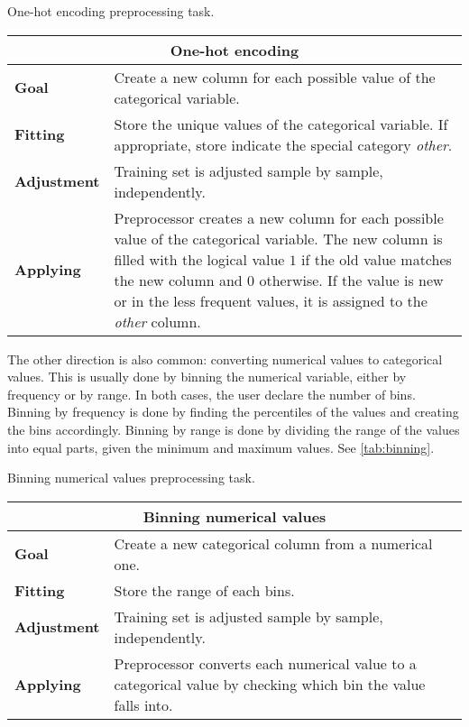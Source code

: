 \begin{tablebox}[label=tab:one-hot]{One-hot encoding preprocessing task.}
  \centering
  \begin{tabular}{lp{6cm}}
    \toprule
    \multicolumn{2}{c}{\textbf{One-hot encoding}} \\
    \midrule
    \textbf{Goal} &
      Create a new column for each possible value of the categorical variable. \\
    \textbf{Fitting} &
      Store the unique values of the categorical variable.  If appropriate, store indicate
      the special category \emph{other}.  \\
    \textbf{Adjustment} &
      Training set is adjusted sample by sample, independently. \\
    \textbf{Applying} &
      Preprocessor creates a new column for each possible value of the categorical
      variable.  The new column is filled with the logical value $1$ if the old value
      matches the new column and $0$ otherwise.  If the value is new or in the less
      frequent values, it is assigned to the \emph{other} column.  \\
    \bottomrule
  \end{tabular}
\end{tablebox}

The other direction is also common: converting numerical values to categorical values.
This is usually done by binning the numerical variable, either by frequency or by range.
In both cases, the user declare the number of bins.  Binning by frequency is done by
finding the percentiles of the values and creating the bins accordingly.  Binning by
range is done by dividing the range of the values into equal parts, given the minimum and
maximum values.  See \cref{tab:binning}.

\begin{tablebox}[label=tab:binning]{Binning numerical values preprocessing task.}
  \centering
  \begin{tabular}{lp{6cm}}
    \toprule
    \multicolumn{2}{c}{\textbf{Binning numerical values}} \\
    \midrule
    \textbf{Goal} &
      Create a new categorical column from a numerical one.  \\
    \textbf{Fitting} &
      Store the range of each bins. \\
    \textbf{Adjustment} &
      Training set is adjusted sample by sample, independently. \\
    \textbf{Applying} &
      Preprocessor converts each numerical value to a categorical value by checking
      which bin the value falls into. \\
    \bottomrule
  \end{tabular}
\end{tablebox}

